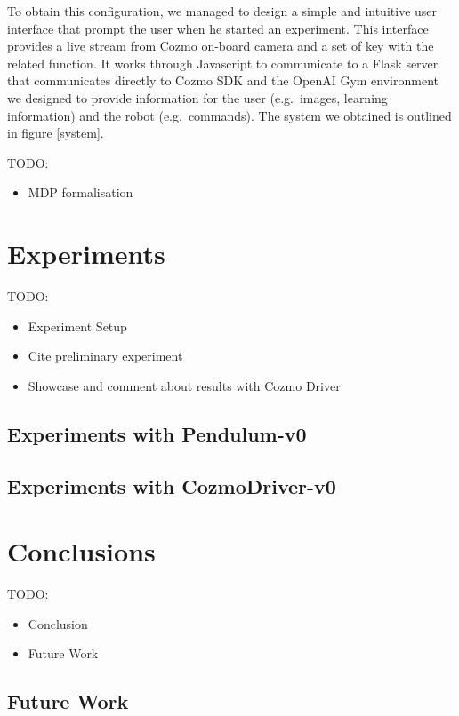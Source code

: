 \documentclass[10pt,twocolumn,letterpaper]{article}
\begin{document}
To obtain this configuration, we managed to design a simple and intuitive user interface that prompt the user when he started an experiment. This interface provides a live stream from Cozmo on-board camera and a set of key with the related function. It works through Javascript to communicate to a Flask server that communicates directly to Cozmo SDK and the OpenAI Gym environment we designed to provide information for the user (e.g.\ images, learning information) and the robot (e.g.\ commands). The system we obtained is outlined in figure \ref{system}.

TODO:
\begin{itemize}
    \item MDP formalisation
\end{itemize}

\section{Experiments}

TODO:
\begin{itemize}
    \item Experiment Setup
    \item Cite preliminary experiment
    \item Showcase and comment about results with Cozmo Driver
\end{itemize}

\subsection{Experiments with Pendulum-v0}

\subsection{Experiments with CozmoDriver-v0}

\section{Conclusions}

TODO:
\begin{itemize}
    \item Conclusion
    \item Future Work
\end{itemize}

\subsection{Future Work}


{\small
    
    
}
\end{document}
